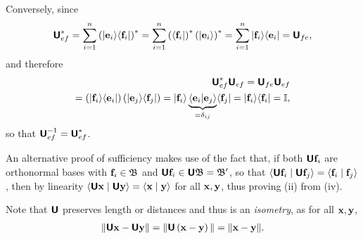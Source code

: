 {Conversely,  since
\begin{equation}
\begin{split}
\textsf{\textbf{U}}_{ef}^\ast
= \sum_{i=1}^n \left(\vert {\bf e}_i \rangle \langle {\bf f}_i \vert \right)^\ast
= \sum_{i=1}^n \left( \langle {\bf f}_i \vert \right)^\ast \left(\vert {\bf e}_i \rangle \right)^\ast
= \sum_{i=1}^n \vert {\bf f}_i \rangle \langle {\bf e}_i \vert = \textsf{\textbf{U}}_{fe},
\end{split}
\label{2016-m-ch-uniteq7134}
\end{equation}   and   therefore
\begin{equation}
\begin{split}
\textsf{\textbf{U}}_{ef}^\ast \textsf{\textbf{U}}_{ef}= \textsf{\textbf{U}}_{fe} \textsf{\textbf{U}}_{ef}
\\
=
\left(\vert {\bf f}_i \rangle \langle {\bf e}_i \vert  \right)
\left(\vert {\bf e}_j \rangle \langle {\bf f}_j \vert \right)
=
 \vert {\bf f}_i \rangle \underbrace{\langle {\bf e}_i \vert   {\bf e}_j \rangle }_{=\delta_{ij}}
\langle {\bf f}_j \vert
=
 \vert {\bf f}_i \rangle   \langle {\bf f}_i \vert
= \mathbb{I},
\end{split}
\label{2016-m-ch-uniteq71345}
\end{equation}
so that
$\textsf{\textbf{U}}_{ef}^{-1} =\textsf{\textbf{U}}_{ef}^\ast$.

An alternative proof of sufficiency makes use of the fact that, if both $\textsf{\textbf{U}} {\bf f}_i$ are  orthonormal bases with ${\bf f}_i \in {\frak B}$
and  $\textsf{\textbf{U}}{\bf f}_i \in \textsf{\textbf{U}}{\frak B}= {\frak B}'$,
so that
$
\langle \textsf{\textbf{U}} {\bf f}_i \mid \textsf{\textbf{U}} {\bf f}_j \rangle
=
\langle {\bf f}_i \mid  {\bf f}_j \rangle$,
then by linearity
$
\langle \textsf{\textbf{U}} {\bf x} \mid \textsf{\textbf{U}} {\bf y} \rangle
=
\langle  {\bf x} \mid  {\bf y} \rangle $
for all ${\bf x},  {\bf y}$,
thus proving (ii) from (iv).





\eproof
}

Note that $\textsf{\textbf{U}}$ preserves length or distances and thus is an {\em isometry}, as for all ${\bf x}, {\bf y}$,
\begin{equation}
\begin{split}
\| \textsf{\textbf{U}}{\bf x} - \textsf{\textbf{U}}{\bf y} \| =
\| \textsf{\textbf{U}}\left( {\bf x} - {\bf y} \right) \| =
\|{\bf x}- {\bf y}\|
.
\end{split}
\label{2016-m-ch-uniteqpl}
\end{equation}


